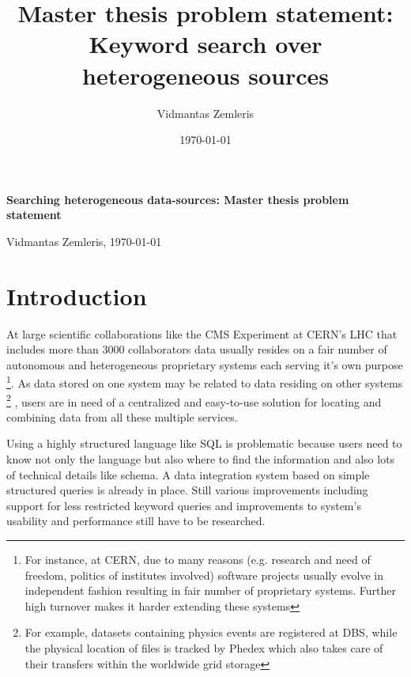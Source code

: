 \documentclass[a4paper,11pt,draft]{article}
\begin{document}
 
\title{Master thesis problem statement: Keyword search over heterogeneous sources} %
\author{Vidmantas Zemleris}  %
\date{\today}  %
 

%
 \centerline{\Large \bf Searching heterogeneous data-sources: Master thesis problem statement} %
 \medskip
 
 \centerline{Vidmantas Zemleris, \today}  %
 \medskip
 


 
\section{Introduction}
At large scientific collaborations like the CMS Experiment at CERN's LHC that includes more than 3000 collaborators data usually resides on a fair number of autonomous and heterogeneous proprietary systems each serving it's own purpose
\footnote{For instance, at CERN,  due to many reasons (e.g. research and need of freedom, politics of institutes involved) software projects usually evolve in independent fashion resulting in fair number of proprietary systems\cite{Koch00CERN}. Further high turnover makes it harder extending these systems}. As data stored on one system may be related to data residing on other systems%
	\footnote{For example, datasets containing physics events are registered at DBS, while the physical location of files is tracked by Phedex which also takes care of their transfers within the worldwide grid storage}%
, users are in need of a centralized and easy-to-use solution for locating and combining data from all these multiple services.

Using a highly structured language like SQL is problematic because users need to know not only the language but also where to find the information and also lots of technical details like schema. A data integration system based on simple structured queries is already in place. Still {\color{red}various improvements including support} for less restricted keyword queries and improvements to system's usability and performance still have to be researched.

\end{document}
